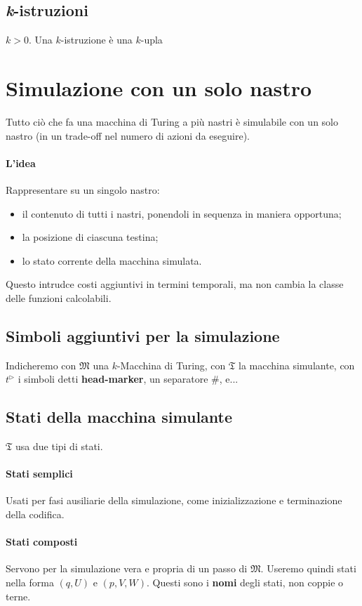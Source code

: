 \subsection{\textit{k}-istruzioni}
$k>0$.
Una $k$-istruzione è una $k$-upla


\newpage
\section{Simulazione con un solo nastro}
Tutto ciò che fa una macchina di Turing a più nastri è simulabile con un solo nastro (in un trade-off nel numero di azioni da eseguire).

\paragraph{L'idea}
Rappresentare su un singolo nastro:
\begin{itemize}
	\item il contenuto di tutti i nastri, ponendoli in sequenza in maniera opportuna;
	\item la posizione di ciascuna testina;
	\item lo stato corrente della macchina simulata.
\end{itemize}
%
Questo intrudce costi aggiuntivi in termini temporali, ma non cambia la classe delle funzioni calcolabili.

\subsection{Simboli aggiuntivi per la simulazione}

Indicheremo con $\mathfrak{M}$ una $k$-Macchina di Turing, con $\mathfrak{T}$ la macchina simulante, con $t^\rhd$ i simboli detti \textbf{head-marker}, un separatore \#, e...


\subsection{Stati della macchina simulante}

$\mathfrak{T}$ usa due tipi di stati.

\paragraph{Stati semplici} Usati per fasi ausiliarie della simulazione, come inizializzazione e terminazione della codifica.

\paragraph{Stati composti} Servono per la simulazione vera e propria di un passo di $\mathfrak{M}$.
Useremo quindi stati nella forma $(q, U)$ e $(p, V, W)$. Questi sono i \textbf{nomi} degli stati, non coppie o terne.

